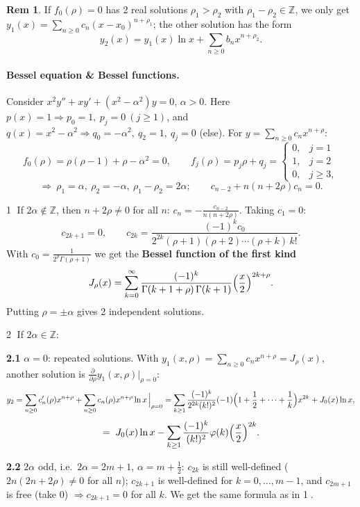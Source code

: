 \documentclass[11pt]{article}
\theoremstyle{definition}
\newtheorem*{remark}{Rem}
\theoremstyle{remark}
\newcommand{\Z}{\mathbb{Z}}
\begin{document}
\begin{remark}
If $f_0(\rho)=0$ has 2 real solutions $\rho_1>\rho_2$ with $\rho_1-\rho_2\in\Z$, we only get
$y_1(x)=\sum_{n\ge0}c_n(x-x_0)^{n+\rho_1}$; the other solution has the form
\[
y_2(x)=y_1(x)\ln x+\sum_{n\ge0}b_nx^{n+\rho_2}.
\]
\end{remark}

\paragraph{Bessel equation \& Bessel functions.}
Consider $x^2y''+xy'+(x^2-\alpha^2)y=0$, $\alpha>0$. Here
$p(x)=1 \Rightarrow p_0=1,\ p_j=0\ (j\ge1)$, and
$q(x)=x^2-\alpha^2 \Rightarrow q_0=-\alpha^2,\ q_2=1,\ q_j=0$ (else). For
$y=\sum_{n\ge0}c_nx^{n+\rho}$:
\[
f_0(\rho)=\rho(\rho-1)+\rho-\alpha^2=0, \qquad
f_j(\rho)=p_j\rho+q_j=\begin{cases} 0, & j=1\\ 1, & j=2\\ 0, & j\ge3, \end{cases}
\]
\[
\Rightarrow\ \rho_1=\alpha,\ \rho_2=-\alpha,\ \rho_1-\rho_2=2\alpha; \qquad c_{n-2}+n(n+2\rho)c_n=0.
\]

\textcircled{1} If $2\alpha\notin\Z$, then $n+2\rho\neq0$ for all $n$:
$c_n=-\frac{c_{n-2}}{n(n+2\rho)}$. Taking $c_1=0$:
\[
c_{2k+1}=0, \qquad c_{2k}=\frac{(-1)^k c_0}{2^{2k}(\rho+1)(\rho+2)\cdots(\rho+k)\,k!}.
\]
With $c_0=\frac{1}{2^{\rho}\Gamma(\rho+1)}$ we get the \textbf{Bessel function of the first kind}
\[
J_{\rho}(x)=\sum_{k=0}^{\infty}\frac{(-1)^k}{\Gamma(k+1+\rho)\,\Gamma(k+1)}\Bigl(\frac{x}{2}\Bigr)^{2k+\rho}.
\]
Putting $\rho=\pm\alpha$ gives 2 independent solutions.

\textcircled{2} If $2\alpha\in\Z$:

\textbf{2.1} $\alpha=0$: repeated solutions. With
$y_1(x,\rho)=\sum_{n\ge0}c_nx^{n+\rho}=J_{\rho}(x)$, another solution is
$\frac{\partial}{\partial\rho}y_1(x,\rho)\big|_{\rho=0}$:
\[
y_2=\sum_{n\ge0}c_n'(\rho)x^{n+\rho}+\sum_{n\ge0}c_n(\rho)x^{n+\rho}\ln x\,\Big|_{\rho=0}
=\sum_{k\ge1}\frac{(-1)^k}{2^{2k}(k!)^2}(-1)\Bigl(1+\frac12+\cdots+\frac1k\Bigr)x^{2k}+J_0(x)\ln x,
\]
\[
=\;J_0(x)\ln x-\sum_{k\ge1}\frac{(-1)^k}{(k!)^2}\varphi(k)\Bigl(\frac{x}{2}\Bigr)^{2k}.
\]

\textbf{2.2} $2\alpha$ odd, i.e.\ $2\alpha=2m+1$, $\alpha=m+\frac12$: $c_{2k}$ is still well-defined
($2n(2n+2\rho)\neq0$ for all $n$); $c_{2k+1}$ is well-defined for $k=0,\dots,m-1$, and $c_{2m+1}$ is
free (take $0$) $\Rightarrow c_{2k+1}=0$ for all $k$. We get the same formula as in \textcircled{1}.
\end{document}
